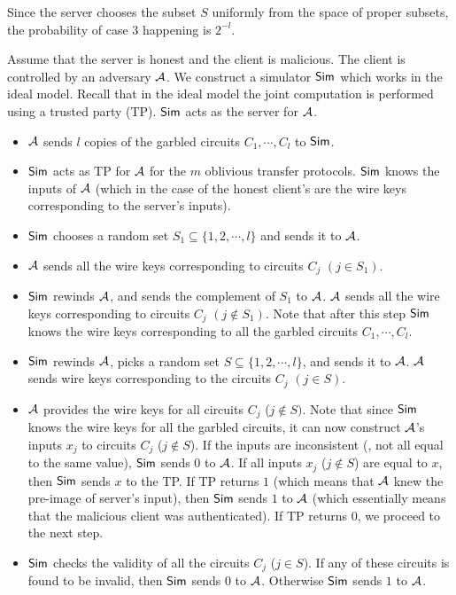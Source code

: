 Since the server chooses the subset $S$ uniformly from the space of
proper subsets, the probability of case 3 happening is $2^{-l}$.

Assume that the server is honest and the client is malicious. The
client is controlled by an adversary ${\cal A}$. We construct a
simulator ${\sf Sim}$ which works in the ideal model. Recall that in
the ideal model the joint computation is performed using a trusted
party (TP). ${\sf Sim}$ acts as the server for ${\cal A}$.
\begin{itemize}
\item ${\cal A}$ sends $l$ copies of the garbled circuits $C_1,\cdots,C_l$ to ${\sf Sim}$.
\item ${\sf Sim}$ acts as TP for ${\cal A}$ for the $m$ oblivious transfer protocols. ${\sf Sim}$ knows the
inputs of ${\cal A}$ (which in the case of the honest client's are the wire keys corresponding to the 
server's inputs).
\item ${\sf Sim}$ chooses a random set $S_1 \subseteq \{ 1,2, \cdots, l \}$ and sends it to ${\cal A}$.

\item ${\cal A}$ sends all the wire keys corresponding to circuits $C_j$ $(j \in S_1)$.

\item ${\sf Sim}$ rewinds ${\cal A}$, and sends the complement of $S_1$ to ${\cal A}$. 
${\cal A}$ sends all the wire keys corresponding to circuits $C_j$ $(j \not\in S_1)$. Note that after this
step ${\sf Sim}$ knows the wire keys corresponding to all the garbled circuits $C_1,\cdots,C_l$.

\item ${\sf Sim}$ rewinds ${\cal A}$, picks a random set $S \subseteq \{ 1,2,\cdots, l \}$, and
sends it to ${\cal A}$. ${\cal A}$ sends wire keys corresponding to the circuits $C_j$ $(j \in S)$. 

\item ${\cal A}$ provides the wire keys for all circuits $C_j$ ($j \not\in S)$. Note that since ${\sf Sim}$
knows the wire keys for all the garbled circuits, it can now construct ${\cal A}$'s inputs $x_j$ to
circuits $C_j$ ($j \not\in S$). If the inputs are inconsistent
(\ie, not all equal to the same value), ${\sf Sim}$ sends $0$ to
${\cal A}$. If all inputs $x_j$ ($j \not\in S$) are equal to $x$, then ${\sf Sim}$ sends
$x$ to the TP. If TP returns $1$ (which means that ${\cal A}$ knew the pre-image of server's input), then
${\sf Sim}$ sends $1$ to ${\cal A}$ (which essentially means that the malicious client was authenticated). 
If TP returns $0$, we proceed to the next step.

\item ${\sf Sim}$ checks the validity of all the circuits $C_j$ ($j \in S$). If any of these circuits is found to be invalid,
then ${\sf Sim}$ sends $0$ to ${\cal A}$. Otherwise ${\sf Sim}$ sends $1$ to ${\cal A}$.
\end{itemize}

